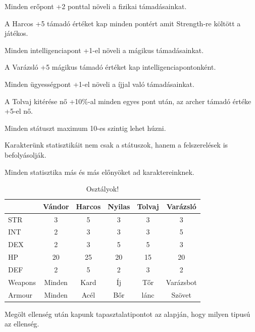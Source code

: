 
\noindent Minden erőpont +2 ponttal növeli a fizikai támadásainkat.

\noindent A Harcos +5 támadó értéket kap minden pontért amit Strength-re költött a játékos.

\noindent Minden intelligenciapont +1-el növeli a mágikus támadásainkat.

\noindent A Varázsló +5 mágikus támadó értéket kap intelligenciapontonként.

\noindent Minden ügyességpont +1-el növeli a íjjal való támadásainkat.

\noindent A Tolvaj kitérése nő +10\%-al minden egyes pont után, az archer támadó értéke +5-el nő.

\noindent Minden státuszt maximum 10-es szintig lehet húzni.


Karakterünk statisztikáit nem csak a státuszok, hanem a felszerelések is befolyásolják.

Minden statisztika más és más előnyöket ad karaktereinknek.

\begin{table}[!ht]
\centering
\caption{Osztályok!}
\label{tab:table1}
\begin{tabular}{|l|c|c|c|c|c|}
\hline
 & Vándor & Harcos & Nyilas & Tolvaj & Varázsló \\
\hline
STR & 3 & 5 & 3 & 3 & 3 \\
\hline
INT & 2 & 3 & 3 & 3 & 5 \\
\hline
DEX & 2 & 3 & 5 & 5 & 3 \\
\hline
HP & 20 & 25 & 20 & 15 & 20 \\
\hline
DEF & 2 & 5 & 2 & 3 & 2 \\
\hline
Weapons & Minden & Kard & Íj & Tőr & Varázsbot \\
\hline
Armour & Minden & Acél & Bőr & lánc & Szövet \\
\hline
\end{tabular}
\end{table}

Megölt ellenség után kapunk tapasztalatipontot az alapján, hogy milyen tipusú az ellenség.


